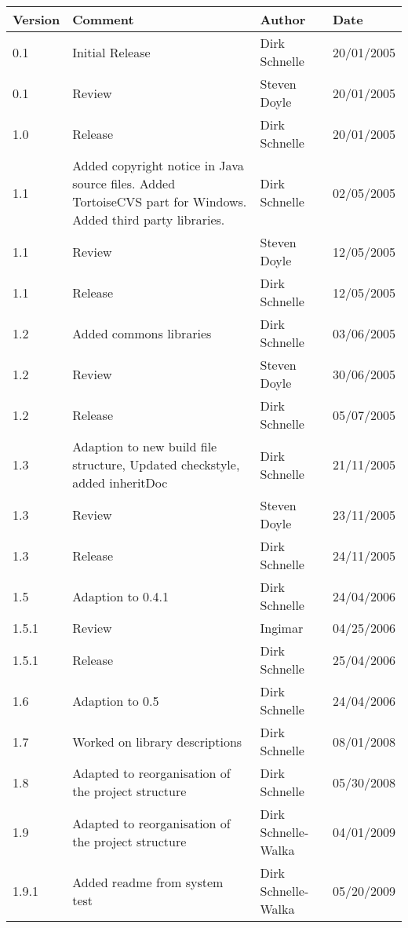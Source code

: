 \documentclass[11pt,a4paper]{article}
\begin{document}
\begin{tabular}{|l|p{5cm}|l|l|}
\hline
\textbf{Version} & \textbf{Comment} & \textbf{Author} & \textbf{Date} \\
\hline
\hline
0.1 & Initial Release & Dirk Schnelle & 20/01/2005 \\
\hline
0.1 & Review & Steven Doyle & 20/01/2005 \\
\hline
1.0 & Release & Dirk Schnelle & 20/01/2005 \\
\hline
1.1 & Added copyright notice in Java source files.
Added TortoiseCVS part for Windows.
Added third party libraries. & Dirk Schnelle & 
 02/05/2005 \\
\hline
1.1 & Review & Steven Doyle & 12/05/2005 \\
\hline
1.1 & Release & Dirk Schnelle & 12/05/2005 \\
\hline
1.2 & Added commons libraries & Dirk Schnelle & 03/06/2005 \\
\hline
1.2 & Review & Steven Doyle & 30/06/2005 \\
\hline
1.2 & Release & Dirk Schnelle & 05/07/2005 \\
\hline
1.3 & Adaption to new build file structure, Updated checkstyle, added 
inheritDoc & Dirk Schnelle & 21/11/2005 \\
\hline
1.3 & Review & Steven Doyle & 23/11/2005 \\
\hline
1.3 & Release & Dirk Schnelle & 24/11/2005 \\
\hline
1.5 & Adaption to 0.4.1  & Dirk Schnelle & 24/04/2006 \\
\hline
1.5.1 & Review & Ingimar  & 04/25/2006 \\
\hline
1.5.1 & Release  & Dirk Schnelle & 25/04/2006 \\
\hline
1.6 & Adaption to 0.5  & Dirk Schnelle & 24/04/2006 \\
\hline
1.7 & Worked on library descriptions  & Dirk Schnelle & 08/01/2008 \\
\hline
1.8 & Adapted to reorganisation of the project structure & Dirk Schnelle &
05/30/2008 \\
\hline
1.9 & Adapted to reorganisation of the project structure & Dirk Schnelle-Walka &
04/01/2009 \\
\hline
1.9.1 & Added readme from system test & Dirk Schnelle-Walka &
05/20/2009 \\
\hline
\end{tabular}




\end{document}
